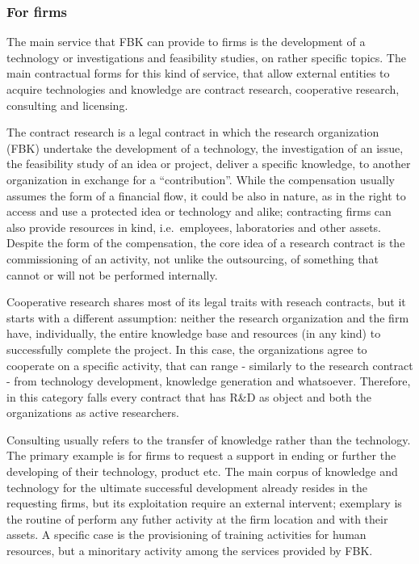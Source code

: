 \subsubsection{For firms}

The main service that FBK can provide to firms is the development of a technology or investigations and feasibility studies, on rather specific topics. The main contractual forms for this kind of service, that allow external entities to acquire technologies and knowledge are contract research, cooperative research, consulting and licensing. 

The contract research is a legal contract in which the research organization (FBK) undertake the development of a technology, the investigation of an issue, the feasibility study of an idea or project, deliver a specific knowledge, to another organization in exchange for a \enquote{contribution}. While the compensation usually assumes the form of a financial flow, it could be also in nature, as in the right to access and use a protected idea or technology and alike; contracting firms can also provide resources in kind, i.e.\ employees, laboratories and other assets. Despite the form of the compensation, the core idea of a research contract is the commissioning of an activity, not unlike the outsourcing, of something that cannot or will not be performed internally.

Cooperative research shares most of its legal traits with reseach contracts, but it starts with a different assumption: neither the research organization and the firm have, individually, the entire knowledge base and resources (in any kind) to successfully complete the project. In this case, the organizations agree to cooperate on a specific activity, that can range - similarly to the research contract - from technology development, knowledge generation and whatsoever. Therefore, in this category falls every contract that has R\&D as object and both the organizations as active researchers.

Consulting usually refers to the transfer of knowledge rather than the technology. The primary example is for firms to request a support in ending or further the developing of their technology, product etc. The main corpus of knowledge and technology for the ultimate successful development already resides in the requesting firms, but its exploitation require an external intervent; exemplary is the routine of perform any futher activity at the firm location and with their assets. A specific case is the provisioning of training activities for human resources, but a minoritary activity among the services provided by FBK.

